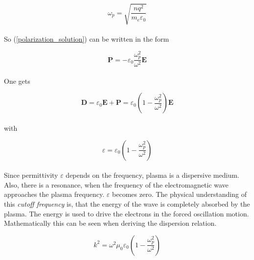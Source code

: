 \documentclass[a4paper,10pt]{thesis}
\begin{document}
\begin{equation}\label{plasmafrequency}
    \omega_p=\sqrt{\frac{nq^2}{m_e\varepsilon_0}}
\end{equation}

\paragraph*{}
So (\ref{polarization_solution}) can be written in the form

\begin{equation}\label{polarization_solution_2}
    \mathbf{P}=- \varepsilon_0\frac{\omega_p^2 }{ \omega^2 } \mathbf{E}
\end{equation}

\paragraph*{}
One gets

\begin{equation}\label{D_plasma}
    \mathbf{D}=\varepsilon_0 \mathbf{E}+\mathbf{P}=\varepsilon_0 \left(1-\frac{\omega_p^2 }{ \omega^2 }\right)\mathbf{E}
\end{equation}

\paragraph*{}
with

\begin{equation}\label{epsilon_plasma}
    \varepsilon=\varepsilon_0 \left(1-\frac{\omega_p^2 }{ \omega^2 }\right)
\end{equation}

\paragraph*{}
Since permittivity $\varepsilon$ depends on the frequency, plasma is a dispersive medium. Also, there is a resonance, when the frequency of the electromagnetic wave approaches the plasma frequency. $\varepsilon$ becomes zero. The physical understanding of this \emph{cutoff frequency} is, that the energy of the wave is completely absorbed by the plasma. The energy is used to drive the electrons in the forced oscillation motion. Mathematically this can be seen when deriving the dispersion relation.

\begin{equation}\label{dispersion_relation_plasma}
    k^2=\omega^2\mu_0\varepsilon_0 \left(1-\frac{\omega_p^2 }{ \omega^2 }\right)
\end{equation}
\end{document}
